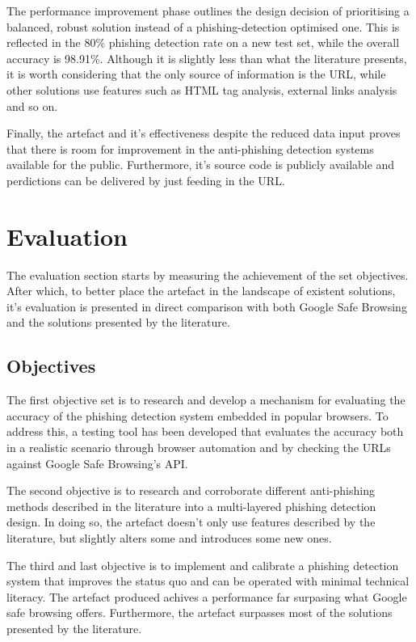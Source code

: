 The performance improvement phase outlines the design decision of prioritising a balanced, robust solution instead of a phishing-detection optimised one. This is reflected in the 80\% phishing detection rate on a new test set, while the overall accuracy is 98.91\%. Although it is slightly less than what the literature presents, it is worth considering that the only source of information is the URL, while other solutions use features such as HTML tag analysis, external links analysis and so on.

Finally, the artefact and it's effectiveness despite the reduced data input proves that there is room for improvement in the anti-phishing detection systems available for the public. Furthermore, it's source code is publicly available and perdictions can be delivered by just feeding in the URL.


\section{Evaluation}
The evaluation section starts by measuring the achievement of the set objectives. After which, to better place the artefact in the landscape of existent solutions, it's evaluation is presented in direct comparison with both Google Safe Browsing and the solutions presented by the literature.

\subsection{Objectives}
The first objective set is to research and develop a mechanism for evaluating the accuracy of the phishing detection system embedded in popular browsers. To address this, a testing tool has been developed that evaluates the accuracy both in a realistic scenario through browser automation and by checking the URLs against Google Safe Browsing's API.

The second objective is to research and corroborate different anti-phishing methods described in the literature into a multi-layered phishing detection design. In doing so, the artefact doesn't only use features described by the literature, but slightly alters some and introduces some new ones. 

The third and last objective is to implement and calibrate a phishing detection system that improves the status quo and can be operated with minimal technical literacy. The artefact produced achives a performance far surpasing what Google safe browsing offers. Furthermore, the artefact surpasses most of the solutions presented by the literature.

